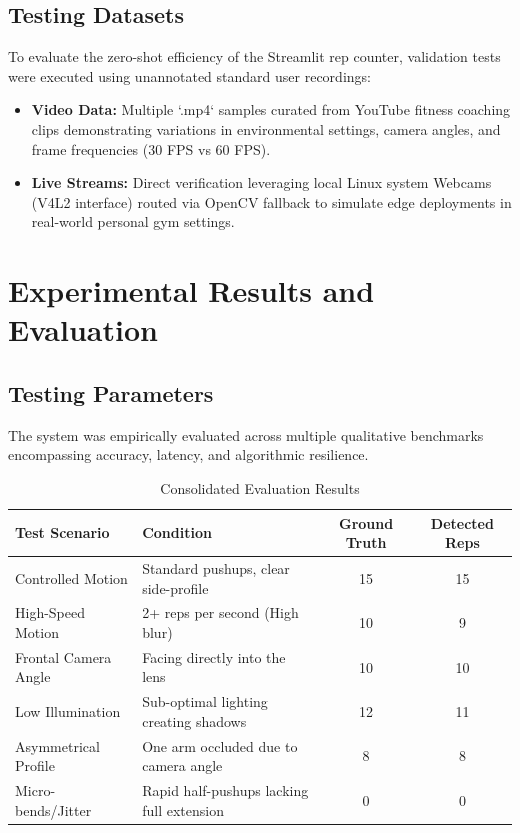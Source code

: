 \documentclass[12pt, a4paper]{article}
\begin{document}
\subsection{Testing Datasets}
To evaluate the zero-shot efficiency of the Streamlit rep counter, validation tests were executed using unannotated standard user recordings:
\begin{itemize}
    \item \textbf{Video Data:} Multiple `.mp4` samples curated from YouTube fitness coaching clips demonstrating variations in environmental settings, camera angles, and frame frequencies (30 FPS vs 60 FPS).
    \item \textbf{Live Streams:} Direct verification leveraging local Linux system Webcams (V4L2 interface) routed via OpenCV fallback to simulate edge deployments in real-world personal gym settings.
\end{itemize}


\section{Experimental Results and Evaluation}

\subsection{Testing Parameters}
The system was empirically evaluated across multiple qualitative benchmarks encompassing accuracy, latency, and algorithmic resilience.

\begin{table}[h]
\centering
\begin{tabular}{@{}llcc@{}}
\toprule
\textbf{Test Scenario} & \textbf{Condition} & \textbf{Ground Truth} & \textbf{Detected Reps} \\ \midrule
Controlled Motion & Standard pushups, clear side-profile & 15 & 15 \\
High-Speed Motion & 2+ reps per second (High blur) & 10 & 9 \\
Frontal Camera Angle & Facing directly into the lens & 10 & 10 \\
Low Illumination & Sub-optimal lighting creating shadows & 12 & 11 \\
Asymmetrical Profile & One arm occluded due to camera angle & 8 & 8 \\
Micro-bends/Jitter & Rapid half-pushups lacking full extension & 0 & 0 \\ \bottomrule
\end{tabular}
\caption{Consolidated Evaluation Results}
\end{table}
\end{document}
